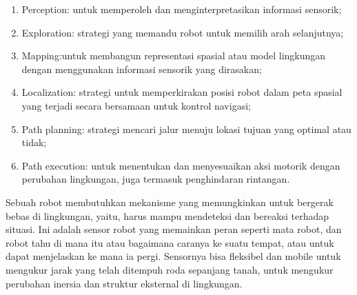 \begin{enumerate}
	\item Perception: untuk memperoleh dan menginterpretasikan informasi sensorik;
	\item Exploration: strategi yang memandu robot untuk memilih arah selanjutnya;
	\item Mapping:untuk membangun representasi spasial atau model lingkungan dengan menggunakan informasi sensorik yang dirasakan;
	\item Localization: strategi untuk memperkirakan posisi robot dalam peta spasial yang terjadi secara bersamaan untuk kontrol navigasi;
	\item Path planning: strategi mencari jalur menuju lokasi tujuan yang optimal atau tidak;
	\item Path execution: untuk menentukan dan menyesuaikan aksi motorik dengan perubahan lingkungan, juga termasuk penghindaran rintangan.
\end{enumerate}

Sebuah robot membutuhkan mekanisme yang memungkinkan untuk bergerak bebas di lingkungan, yaitu, harus mampu mendeteksi dan bereaksi terhadap situasi. Ini adalah sensor robot yang memainkan peran seperti mata robot, dan robot tahu di mana itu atau bagaimana caranya ke suatu tempat, atau untuk dapat menjelaskan ke mana ia pergi. Sensornya bisa fleksibel dan mobile untuk mengukur jarak yang telah ditempuh roda sepanjang tanah, untuk mengukur perubahan inersia dan struktur eksternal di lingkungan.


